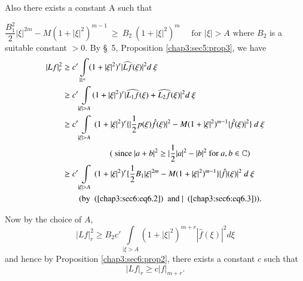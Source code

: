 Also there exists a constant A such that

$\dfrac{B^2_1}{2} | \xi |^{2m}  - M(1 + | \xi |^2 )^{m-1} ~ \geq ~ B_2
~ (1 + | \xi |^2 )^m \quad \text{ for } | \xi | > A \text{ where }
B_2$ is a suitable constant $ > 0$. By \S\ 5,
Proposition \ref{chap3:sec5:prop3}, we have 
\begin{align*}
  | Lf |^2_r  & \geq c' \int\limits_{\mathbb{R}^n} ( 1+ | \xi |^2)^r
  | \widehat{Lf} (\xi ) |^2 d~ \xi\\ 
  & \geq c' \int\limits_{| \xi | > A}
  ( 1+ | \xi |^2)^r | \widehat{L_1f}(\xi ) + \widehat{L_2 f} (\xi)
  |^2 d ~ \xi \\ 
  & \geq c' \int\limits_{ | \xi | > A} ~(1 + | \xi |^2)^r \{
  | \frac{1}{2} p (\xi ) \hat{f} (\xi ) |^2 - M (1+ | \xi |^2)^{m-1} |
  \hat{f} (\xi )|^2 \} ~ d ~ \xi\\ 
  & \hspace{2cm} ( \text{ since } | a + b  |^2 \geq
  | \frac{1}{2} | a |^2 - | b |^2 \text{ for } a, b \in \mathbb{C}) \\ 
  & \geq  c' \int\limits_{| \xi | > A} ~ (1 + | \xi |^2 )^r \{
  \frac{1}{2} B_1 | \xi |^{2m} - M(1+ | \xi |^2 )^{m-1} \} | \hat{f}
  | (\xi ) |^2 ~ d ~ \xi\\ 
  & \tag*{\text{(by  ~(\ref{chap3:sec6:eq6.2})~  and
  | ~(\ref{chap3:sec6:eq6.3})).}}  
\end{align*}

Now by the choice of $A$, 
$$
| Lf |^2_r \geq B_2 c' \int\limits_{| \xi > A} ( 1+ | \xi |^2 )^{m+r}
|\hat{f} (\xi)|^2 d \xi 
$$
and hence by Proposition \ref{chap3:sec6:prop2}, there exists a
constant $c$ such that 
$$
| Lf | _r \geq  c | f |_{m+r}.
$$

